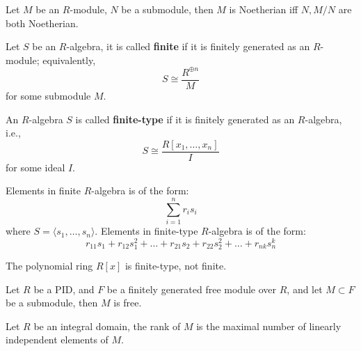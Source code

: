 \documentclass[openany]{book}
\newcommand{\la}{\langle}
\newcommand{\ra}{\rangle}
\begin{document}
\begin{prop}
    Let $M$ be an $R$-module, $N$ be a submodule, then $M$ is Noetherian iff $N,M/N$ are both Noetherian.
\end{prop}

\begin{defn}
    Let $S$ be an $R$-algebra, it is called \textbf{finite} if it is finitely generated as an $R$-module; equivalently, 
    \begin{equation*}
        S\cong\frac{R^{\oplus n}}{M}
    \end{equation*}
    for some submodule $M$. 

    An $R$-algebra $S$ is called \textbf{finite-type} if it is finitely generated as an $R$-algebra, i.e., 
    \begin{equation*}
        S\cong\frac{R[x_1,\dots, x_n]}{I}
    \end{equation*}
    for some ideal $I$.
\end{defn}
Elements in finite $R$-algebra is of the form:
\begin{equation*}
    \sum_{i=1}^nr_is_i
\end{equation*}
where $S=\la s_1,\dots, s_n\ra$. Elements in finite-type $R$-algebra is of the form:
\begin{equation*}
    r_{11}s_1+r_{12}s_1^2+\dots+r_{21}s_2+r_{22}s_2^2+\dots+r_{nk}s_n^k
\end{equation*}


\begin{prop}
    The polynomial ring $R[x]$ is finite-type, not finite.
\end{prop}


\begin{prop}
    Let $R$ be a PID, and $F$ be a finitely generated free module over $R$, and let $M\subset F$ be a submodule, then $M$ is free.
\end{prop}


\begin{defn}[???]
    Let $R$ be an integral domain, the rank of $M$ is the maximal number of linearly independent elements of $M$.
\end{defn}
\end{document}
